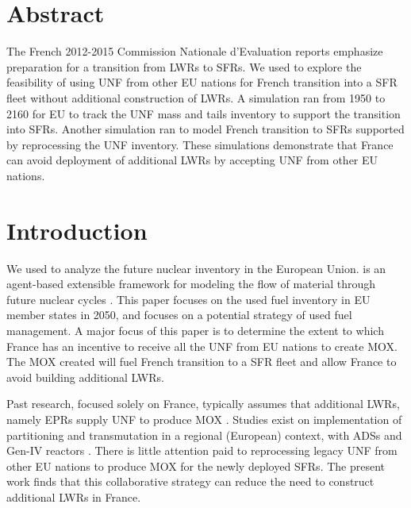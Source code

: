 \section{Abstract}
The French 2012-2015 Commission Nationale d'Evaluation reports
\cite{cne2_reports_2015} emphasize preparation for a transition from \glspl{LWR} to \glspl{SFR}.
We used \Cyclus to explore the feasibility of using \gls{UNF} from other EU nations
for French transition into a \gls{SFR} fleet without additional construction of \glspl{LWR}.
A \Cyclus simulation ran from 1950 to 2160 for EU to track the \gls{UNF} mass
and tails inventory to support
the transition into \glspl{SFR}. Another simulation ran to model French
transition to \glspl{SFR} supported by reprocessing the \gls{UNF} inventory.
These simulations demonstrate that France can avoid deployment
of additional \glspl{LWR} by accepting \gls{UNF} from other EU nations.


\section{Introduction}
We used \Cyclus to analyze
the future nuclear inventory in the European Union. \Cyclus is an agent-based extensible
framework for modeling the flow of material through future nuclear cycles \cite{huff_fundamental_2016}.
This paper focuses on the used fuel
inventory in \gls{EU} member states in 2050, and focuses on a potential strategy of used fuel
management.
A major focus of this paper is to determine the extent to which France has an incentive
to receive all the \gls{UNF} from \gls{EU} nations to create \gls{MOX}.
The \gls{MOX} created will fuel French transition to a \gls{SFR} fleet
and allow France to avoid building additional \glspl{LWR}.

Past research, focused solely on France, typically assumes that additional \glspl{LWR},
namely \glspl{EPR} supply \gls{UNF} to produce \gls{MOX} \cite{carre_overview_2009, martin_symbiotic_2017, freynet_multiobjective_2016}.
Studies exist on implementation of partitioning and transmutation
in a regional (European) context, with \glspl{ADS} and Gen-IV reactors \cite{fazio_study_2013}.
There is little attention paid to reprocessing legacy \gls{UNF} from other
EU nations to produce \gls{MOX} for the newly deployed \glspl{SFR}.
The present work finds that this collaborative strategy can reduce the
need to construct additional \glspl{LWR} in France.

